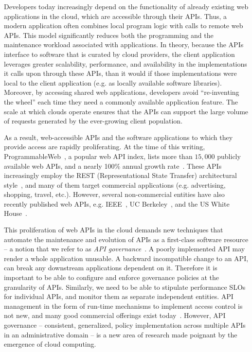 Developers today
increasingly depend on the functionality of already existing web applications in the cloud, which
are accessible through their APIs. Thus, a modern application 
often combines local program logic with calls to remote web APIs. 
This model significantly reduces both the programming and
the maintenance workload associated with applications. In theory, because
the APIs interface to software that is curated by cloud providers, the client
application leverages greater scalability, performance, 
and availability in the implementations it calls upon through these APIs, than
it would if those implementations were local to the client application
(e.g. as locally available software libraries).
Moreover, by accessing shared web applications, developers avoid ``re-inventing the
wheel'' each time they need a commonly available application feature. The scale at
which clouds operate ensures that the APIs can support the large volume
of requests generated by the ever-growing client population.

As a result, web-accessible APIs and the software applications to which
they provide access are rapidly proliferating. At the time of this writing, 
ProgrammableWeb~\cite{pweb}, a popular web API index, lists more than $15,000$
publicly available web APIs, and a nearly 100\% annual growth rate~\cite{pweb_growth}.
These APIs increasingly employ the REST (Representational State Transfer) architectural style~\cite{Fielding:2000:ASD:932295}, and 
many of them target commercial applications (e.g. advertising, shopping, travel, etc.).
However, several non-commercial entities have also recently published web 
APIs, e.g. IEEE~\cite{ieeeapis}, UC Berkeley~\cite{ucbapis}, and the US White
House~\cite{whitehouseapis}. 

This proliferation of web APIs in the cloud demands new techniques that
automate the maintenance and evolution of APIs as a first-class software
resource -- a notion that we refer
to as \textit{API governance}~\cite{6903538}. A poorly implemented API may render a whole application unusable.
A backward incompatible change to an API, can break any downstream applications dependent on it. 
Therefore it is important to be able to configure and enforce governance policies at the granularity of
APIs. Similarly, we need to be able to stipulate performance SLOs for individual APIs, and monitor
them as separate independent entities.
API management in the form of run-time mechanisms to implement
access control is not new, and many good commercial offerings exist today~\cite{3scale,apigee,layer7}.   
However, API governance -- consistent, generalized, policy
implementation across multiple APIs in an administrative domain --
is a new area of research made poignant by the emergence of cloud computing.